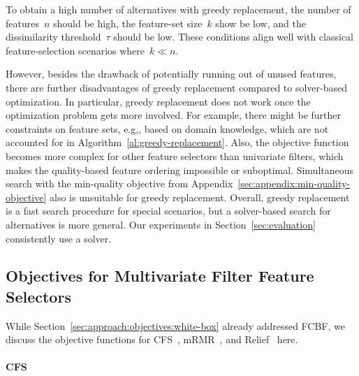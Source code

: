 \documentclass{article}
\theoremstyle{definition}
\begin{document}
To obtain a high number of alternatives with greedy replacement, the number of features~$n$ should be high, the feature-set size~$k$ show be low, and the dissimilarity threshold~$\tau$ should be low.
These conditions align well with classical feature-selection scenarios where~$k \ll n$.

However, besides the drawback of potentially running out of unused features, there are further disadvantages of greedy replacement compared to solver-based optimization.
In particular, greedy replacement does not work once the optimization problem gets more involved.
For example, there might be further constraints on feature sets, e.g,, based on domain knowledge, which are not accounted for in Algorithm~\ref{al:greedy-replacement}.
Also, the objective function becomes more complex for other feature selectors than univariate filters, which makes the quality-based feature ordering impossible or suboptimal.
Simultaneous search with the min-quality objective from Appendix~\ref{sec:appendix:min-quality-objective} also is unsuitable for greedy replacement.
Overall, greedy replacement is a fast search procedure for special scenarios, but a solver-based search for alternatives is more general.
Our experiments in Section~\ref{sec:evaluation} consistently use a solver.

\subsection{Objectives for Multivariate Filter Feature Selectors}
\label{sec:appendix:multivariate-filter-objectives}

While Section~\ref{sec:approach:objectives:white-box} already addressed FCBF, we discuss the objective functions for CFS~\cite{hall1999correlation, hall2000correlation}, mRMR~\cite{peng2005feature}, and Relief~\cite{kira1992feature, robnik1997adaptation} here.

\paragraph{CFS}
\end{document}
